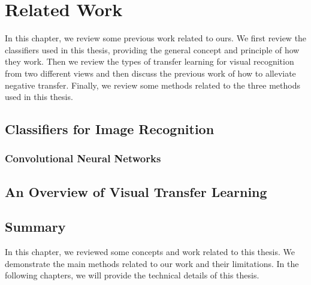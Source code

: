 \chapter{Related Work}\label{sec:works}
In this chapter, we review some previous work related to ours. We first review the classifiers used in this thesis, providing the general concept and principle of how they work. Then we review the types of transfer learning for visual recognition from two different views and then discuss the previous work of how to alleviate negative transfer. Finally, we review some methods related to the three methods used in this thesis.
\section{Classifiers for Image Recognition}\label{sec:relat:linear}

\subsection{Convolutional Neural Networks}

\section{An Overview of Visual Transfer Learning}

\section{Summary}
In this chapter, we reviewed some concepts and work related to this thesis. We demonstrate the main methods related to our work and their limitations. In the following chapters, we will provide the technical details of this thesis. 